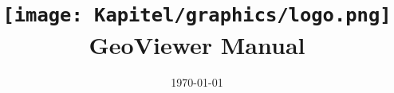 \documentclass[parskip=full]{scrreport}
\title{\texttt{[image: Kapitel/graphics/logo.png]}\\GeoViewer Manual}
\date{\today}
\begin{document}
\maketitle
\titlepage

\tableofcontents
















\end{document}
